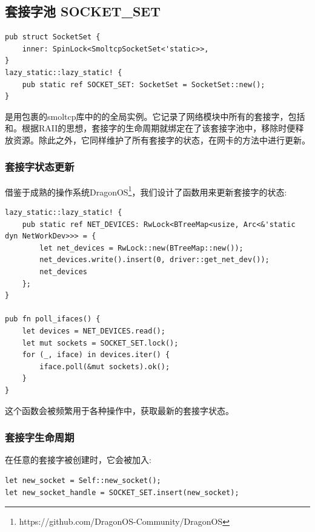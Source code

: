\documentclass{article}
\begin{document}
\subsection{套接字池 SOCKET\_SET}

\begin{lstlisting}
pub struct SocketSet {
    inner: SpinLock<SmoltcpSocketSet<'static>>,
}
lazy_static::lazy_static! {
    pub static ref SOCKET_SET: SocketSet = SocketSet::new();
}
\end{lstlisting}

是用包裹的smoltcp库中的的全局实例。它记录了网络模块中所有的套接字，包括和。根据RAII的思想，套接字的生命周期就绑定在了该套接字池中，移除时便释放资源。除此之外，它同样维护了所有套接字的状态，在网卡的方法中进行更新。

\subsubsection{套接字状态更新}

借鉴于成熟的操作系统DragonOS\footnote{https://github.com/DragonOS-Community/DragonOS}，我们设计了函数用来更新套接字的状态:
\begin{lstlisting}
lazy_static::lazy_static! {
    pub static ref NET_DEVICES: RwLock<BTreeMap<usize, Arc<&'static dyn NetWorkDev>>> = {
        let net_devices = RwLock::new(BTreeMap::new());
        net_devices.write().insert(0, driver::get_net_dev());
        net_devices
    };
}

pub fn poll_ifaces() {
    let devices = NET_DEVICES.read();
    let mut sockets = SOCKET_SET.lock();
    for (_, iface) in devices.iter() {
        iface.poll(&mut sockets).ok();
    }
}
\end{lstlisting}

这个函数会被频繁用于各种操作中，获取最新的套接字状态。

\subsubsection{套接字生命周期}

在任意的套接字被创建时，它会被加入:

\begin{lstlisting}
let new_socket = Self::new_socket();
let new_socket_handle = SOCKET_SET.insert(new_socket);
\end{lstlisting}
\end{document}
